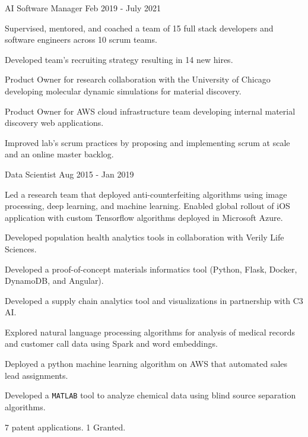 \begin{cventries}
  \cventry
    {AI Software Manager} %
    {}
    {}
    {Feb 2019 - July 2021} %
    {
      \begin{cvitems} %
      \item {Supervised, mentored, and coached a team of 15 full stack developers and software engineers across 10 scrum
          teams.}
       \item {Developed team's recruiting strategy resulting in 14 new hires.}
       \item {Product Owner for research collaboration with the University of Chicago
           developing molecular dynamic simulations for material discovery.}
       \item {Product Owner for AWS cloud infrastructure team developing internal material discovery
           web applications.}
       \item {Improved lab's scrum practices by proposing and implementing scrum at scale
           and an online master backlog.}
      \end{cvitems}
    }

  \cventry
    {Data Scientist} %
    {} %
    {} %
    {Aug 2015 - Jan 2019} %
    {
      \begin{cvitems} %
      \item {Led a research team that deployed anti-counterfeiting algorithms using image
          processing, deep learning, and machine learning. Enabled global
          rollout of iOS application with custom Tensorflow algorithms deployed in
          Microsoft Azure.}
        \item {Developed population health analytics tools in collaboration with Verily
            Life Sciences.}
        \item {Developed a proof-of-concept materials informatics tool (Python, Flask,
            Docker, DynamoDB, and Angular).}
        \item {Developed a supply chain analytics tool and visualizations in partnership
            with C3 AI.}
        \item {Explored natural language processing algorithms for analysis of medical
            records and customer call data using Spark and word embeddings.}
        \item {Deployed a python machine learning algorithm on AWS that automated sales
            lead assignments.}
        \item {Developed a {\texttt{MATLAB}} tool to analyze chemical data using blind source
            separation algorithms.}
        \item {7 patent applications. 1 Granted.}
      \end{cvitems}
    }


\end{cventries}
